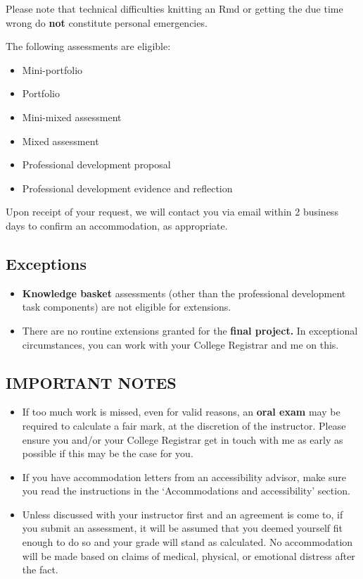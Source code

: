 \documentclass[
  openany]{book}
\begin{document}
Please note that technical difficulties knitting an Rmd or getting the due time wrong do \textbf{not} constitute personal emergencies.

The following assessments are eligible:

\begin{itemize}
\item
  Mini-portfolio
\item
  Portfolio
\item
  Mini-mixed assessment
\item
  Mixed assessment
\item
  Professional development proposal
\item
  Professional development evidence and reflection
\end{itemize}

Upon receipt of your request, we will contact you via email within 2 business days to confirm an accommodation, as appropriate.

\hypertarget{exceptions}{%
\subsection{Exceptions}\label{exceptions}}

\begin{itemize}
\item
  \textbf{Knowledge basket} assessments (other than the professional development task components) are not eligible for extensions.
\item
  There are no routine extensions granted for the \textbf{final project.} In exceptional circumstances, you can work with your College Registrar and me on this.
\end{itemize}

\hypertarget{important-notes}{%
\subsection{IMPORTANT NOTES}\label{important-notes}}

\begin{itemize}
\item
  If too much work is missed, even for valid reasons, an \textbf{oral exam} may be required to calculate a fair mark, at the discretion of the instructor. Please ensure you and/or your College Registrar get in touch with me as early as possible if this may be the case for you.
\item
  If you have accommodation letters from an accessibility advisor, make sure you read the instructions in the `Accommodations and accessibility' section.
\item
  Unless discussed with your instructor first and an agreement is come to, if you submit an assessment, it will be assumed that you deemed yourself fit enough to do so and your grade will stand as calculated. No accommodation will be made based on claims of medical, physical, or emotional distress after the fact.
\end{itemize}
\end{document}
